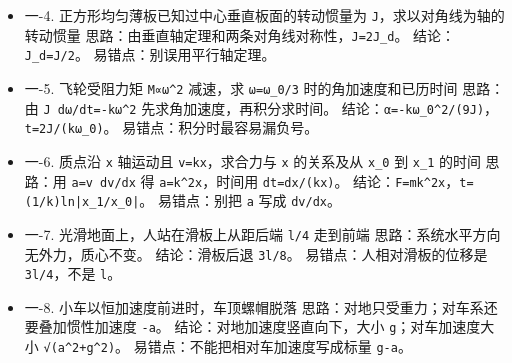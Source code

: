 \documentclass[12pt,a4paper]{ctexart}
\begin{document}
\begin{itemize}

\item 一-4. 正方形均匀薄板已知过中心垂直板面的转动惯量为 \texttt{J}，求以对角线为轴的转动惯量 思路：由垂直轴定理和两条对角线对称性，\texttt{J=2J\_d}。 结论：\texttt{J\_d=J/2}。 易错点：别误用平行轴定理。

\end{itemize}

\begin{itemize}

\item 一-5. 飞轮受阻力矩 \texttt{M∝ω\textasciicircum{}2} 减速，求 \texttt{ω=ω\_0/3} 时的角加速度和已历时间 思路：由 \texttt{J dω/dt=-kω\textasciicircum{}2} 先求角加速度，再积分求时间。 结论：\texttt{α=-kω\_0\textasciicircum{}2/(9J)}，\texttt{t=2J/(kω\_0)}。 易错点：积分时最容易漏负号。

\end{itemize}

\begin{itemize}

\item 一-6. 质点沿 \texttt{x} 轴运动且 \texttt{v=kx}，求合力与 \texttt{x} 的关系及从 \texttt{x\_0} 到 \texttt{x\_1} 的时间 思路：用 \texttt{a=v dv/dx} 得 \texttt{a=k\textasciicircum{}2x}，时间用 \texttt{dt=dx/(kx)}。 结论：\texttt{F=mk\textasciicircum{}2x}，\texttt{t=(1/k)ln|x\_1/x\_0|}。 易错点：别把 \texttt{a} 写成 \texttt{dv/dx}。

\end{itemize}

\begin{itemize}

\item 一-7. 光滑地面上，人站在滑板上从距后端 \texttt{l/4} 走到前端 思路：系统水平方向无外力，质心不变。 结论：滑板后退 \texttt{3l/8}。 易错点：人相对滑板的位移是 \texttt{3l/4}，不是 \texttt{l}。

\end{itemize}

\begin{itemize}

\item 一-8. 小车以恒加速度前进时，车顶螺帽脱落 思路：对地只受重力；对车系还要叠加惯性加速度 \texttt{-a}。 结论：对地加速度竖直向下，大小 \texttt{g}；对车加速度大小 \texttt{√(a\textasciicircum{}2+g\textasciicircum{}2)}。 易错点：不能把相对车加速度写成标量 \texttt{g-a}。

\end{itemize}
\end{document}
